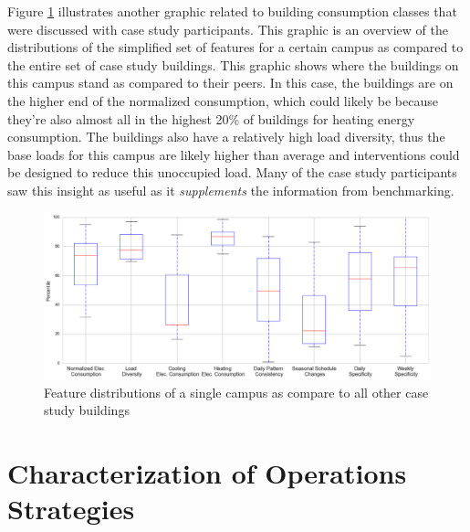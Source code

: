 Figure \ref{fig:campusperformance} illustrates another graphic related to building consumption classes that were discussed with case study participants. This graphic is an overview of the distributions of the simplified set of features for a certain campus as compared to the entire set of case study buildings. This graphic shows where the buildings on this campus stand as compared to their peers. In this case, the buildings are on the higher end of the normalized consumption, which could likely be because they're also almost all in the highest 20\% of buildings for heating energy consumption. The buildings also have a relatively high load diversity, thus the base loads for this campus are likely higher than average and interventions could be designed to reduce this unoccupied load. Many of the case study participants saw this insight as useful as it \emph{supplements} the information from benchmarking.

\begin{figure}[ht!]
\begin{center}
\includegraphics[width=0.98\columnwidth]{figures/benchmarkingbuildings/benchmarkingbuildings}
\caption{{Feature distributions of a single campus as compare to all other case study buildings
\label{fig:campusperformance}%
}}
\end{center}
\end{figure}

\section{Characterization of Operations Strategies}
\label{sec:operations_strategies}

